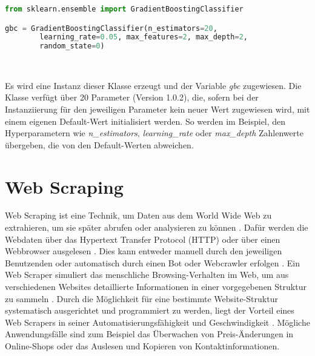 \documentclass[german,bachelor]{swsLeipzig}
\begin{document}
\begin{lstlisting}[language=Python, frame=single, basicstyle=\small]
from sklearn.ensemble import GradientBoostingClassifier

gbc = GradientBoostingClassifier(n_estimators=20,
        learning_rate=0.05, max_features=2, max_depth=2,
        random_state=0)
\end{lstlisting}
\

Es wird eine Instanz dieser Klasse erzeugt und der Variable \textit{gbc} zugewiesen.
Die Klasse verfügt über 20 Parameter (Version 1.0.2), die, sofern bei der Instanziierung für den jeweiligen Parameter
kein neuer Wert zugewiesen wird, mit einem eigenen Default-Wert initialisiert werden.
So werden im Beispiel, den Hyperparametern wie \textit{n\_estimators}, \textit{learning\_rate} oder \textit{max\_depth}
Zahlenwerte übergeben, die von den Default-Werten abweichen.\\


\section{Web Scraping}
Web Scraping ist eine Technik, um Daten aus dem World Wide Web zu extrahieren, um sie später abrufen oder analysieren zu können \cite[]{zhao2017web}.
Dafür werden die Webdaten über das Hypertext Transfer Protocol (HTTP) oder über einen Webbrowser ausgelesen \cite[]{zhao2017web}.
Dies kann entweder manuell durch den jeweiligen Benutzenden oder automatisch durch einen Bot oder Webcrawler erfolgen \cite[]{zhao2017web}.
Ein Web Scraper simuliert das menschliche Browsing-Verhalten im Web, um aus verschiedenen Websites
detaillierte Informationen in einer vorgegebenen Struktur zu sammeln \cite[]{9005594}.
Durch die Möglichkeit für eine bestimmte Website-Struktur systematisch ausgerichtet und programmiert zu werden, liegt der Vorteil
eines Web Scrapers in seiner Automatisierungsfähigkeit und Geschwindigkeit \cite[]{9005594}.
Mögliche Anwendungsfälle sind zum Beispiel das Überwachen von Preis-Änderungen in Online-Shops oder das Auslesen und Kopieren
von Kontaktinformationen.\\
\end{document}
